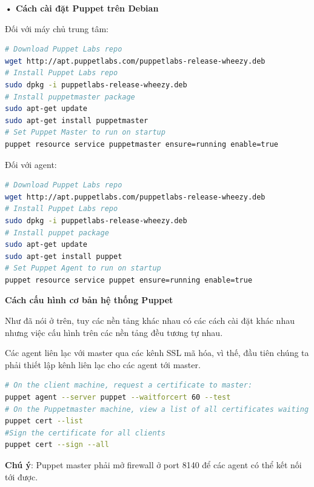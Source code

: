 \textbf{• Cách cài đặt Puppet trên Debian}

Đối với máy chủ trung tâm:

\begin{lstlisting}[label={lst:puppet_install_master_debian},caption={Cách cài đặt puppet master trên Debian}, language=bash, deletekeywords={enable, true}]
# Download Puppet Labs repo
wget http://apt.puppetlabs.com/puppetlabs-release-wheezy.deb
# Install Puppet Labs repo
sudo dpkg -i puppetlabs-release-wheezy.deb
# Install puppetmaster package
sudo apt-get update
sudo apt-get install puppetmaster
# Set Puppet Master to run on startup
puppet resource service puppetmaster ensure=running enable=true
\end{lstlisting}

Đối với agent:

\begin{lstlisting}[label={lst:puppet_install_agent_debian},caption={Cách cài đặt puppet agent trên Debian}, language=bash, deletekeywords={enable, true}]
# Download Puppet Labs repo
wget http://apt.puppetlabs.com/puppetlabs-release-wheezy.deb
# Install Puppet Labs repo
sudo dpkg -i puppetlabs-release-wheezy.deb
# Install puppet package
sudo apt-get update
sudo apt-get install puppet
# Set Puppet Agent to run on startup
puppet resource service puppet ensure=running enable=true
\end{lstlisting}

\textbf{\large Cách cấu hình cơ bản hệ thống Puppet}

Như đã nói ở trên, tuy các nền tảng khác nhau có các cách cài đặt khác nhau nhưng việc cấu hình trên các nền tảng đều tương tự nhau.

Các agent liên lạc với master qua các kênh SSL mã hóa, vì thế, đầu tiên chúng ta phải thiết lập kênh liên lạc cho các agent tới master.

\begin{lstlisting}[label={lst:puppet_config_ssl},caption={Thiết lập kết nối qua kênh SSL}, language=bash, deletekeywords={test}]
# On the client machine, request a certificate to master:
puppet agent --server puppet --waitforcert 60 --test
# On the Puppetmaster machine, view a list of all certificates waiting to be signed:
puppet cert --list
#Sign the certificate for all clients
puppet cert --sign --all
\end{lstlisting}

\textbf{Chú ý}: Puppet master phải mở firewall ở port 8140 để các agent có thể kết nối tới được.

